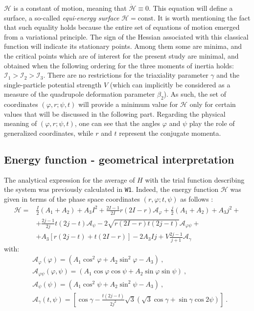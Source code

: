 \documentclass[myclassdoc,debug]{rjparticle}
\begin{document}
$\mathcal{H}$ is a constant of motion, meaning that $\dot{\mathcal{H}}\equiv0$. This equation will define a surface, a so-called \emph{equi-energy surface} $\mathcal{H}=\text{const}$. It is worth mentioning the fact that such equality holds because the entire set of equations of motion emerged from a variational principle. The sign of the Hessian associated with this classical function will indicate its stationary points. Among them some are minima, and the critical points which are of interest for the present study are minimal, and obtained when the following ordering for the three moments of inertia holds: $\mathcal{I}_1>\mathcal{I}_2>\mathcal{I}_3$. There are no restrictions for the triaxiality parameter $\gamma$ and the single-particle potential strength $V$ (which can implicitly be considered as a measure of the quadrupole deformation parameter $\beta_2$). As such, the set of coordinates $(\varphi,r;\psi,t)$ will provide a minimum value for $\mathcal{H}$ only for certain values that will be discussed in the following part. Regarding the physical meaning of $(\varphi,r;\psi,t)$, one can see that the angles $\varphi$ and $\psi$ play the role of generalized coordinates, while $r$ and $t$ represent the conjugate momenta.

\subsection{Energy function - geometrical interpretation}

The analytical expression for the average of $H$ with the trial function describing the system was previously calculated in \texttt{W1}. Indeed, the energy function $\mathcal{H}$ was given in terms of the phase space coordinates $(r,\varphi;t,\psi)$ as follows \cite{raduta2020approach}:
\begin{align}
    \mathcal{H}=&\frac{I}{2}(A_1+A_2)+A_3I^2+\frac{2I-1}{2I}r(2I-r)\mathcal{A}_\varphi+\frac{j}{2}(A_1+A_2)+A_3j^2+ \nonumber\\
    &+\frac{2j-1}{2j}t(2j-t)\mathcal{A}_\psi-2\sqrt{r(2I-r)t(2j-t)}\mathcal{A}_{\varphi\psi}+\nonumber\\
    &+A_3\left[r(2j-t)+t(2I-r)\right]-2A_3Ij+V\frac{2j-1}{j+1}\mathcal{A}_\gamma
    \label{energy-function-analytical}
\end{align}
with:
\begin{align}
    &\mathcal{A}_\varphi(\varphi)=(A_1\cos^2\varphi+A_2\sin^2\varphi-A_3)\ , \nonumber\\
    &\mathcal{A}_{\varphi\psi}(\varphi,\psi)=(A_1\cos\varphi\cos\psi+A_2\sin\varphi\sin\psi)\ ,\nonumber\\
    &\mathcal{A}_\psi(\psi)=(A_1\cos^2\psi+A_2\sin^2\psi-A_3)\ , \nonumber\\
    &\mathcal{A}_\gamma(t,\psi)=\left[\cos\gamma-\frac{t(2j-t)}{2j^2}\sqrt{3}(\sqrt{3}\cos\gamma+\sin\gamma\cos2\psi)\right]\ .
    \label{special-terms-energy-function}
\end{align}
\end{document}
